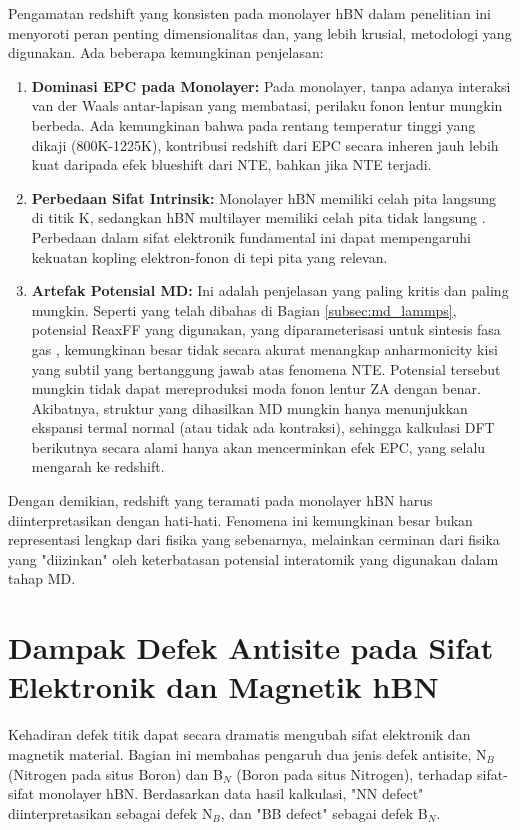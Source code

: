 Pengamatan redshift yang konsisten pada monolayer hBN dalam penelitian ini menyoroti peran penting dimensionalitas dan, yang lebih krusial, metodologi yang digunakan. Ada beberapa kemungkinan penjelasan:
\begin{enumerate}
    \item \textbf{Dominasi EPC pada Monolayer:} Pada monolayer, tanpa adanya interaksi van der Waals antar-lapisan yang membatasi, perilaku fonon lentur mungkin berbeda. Ada kemungkinan bahwa pada rentang temperatur tinggi yang dikaji (800K-1225K), kontribusi redshift dari EPC secara inheren jauh lebih kuat daripada efek blueshift dari NTE, bahkan jika NTE terjadi.
    \item \textbf{Perbedaan Sifat Intrinsik:} Monolayer hBN memiliki celah pita langsung di titik K, sedangkan hBN multilayer memiliki celah pita tidak langsung \citep{Wickramaratne2018}. Perbedaan dalam sifat elektronik fundamental ini dapat mempengaruhi kekuatan kopling elektron-fonon di tepi pita yang relevan.
    \item \textbf{Artefak Potensial MD:} Ini adalah penjelasan yang paling kritis dan paling mungkin. Seperti yang telah dibahas di Bagian \ref{subsec:md_lammps}, potensial ReaxFF yang digunakan, yang diparameterisasi untuk sintesis fasa gas \citep{Lele2022}, kemungkinan besar tidak secara akurat menangkap anharmonicity kisi yang subtil yang bertanggung jawab atas fenomena NTE. Potensial tersebut mungkin tidak dapat mereproduksi moda fonon lentur ZA dengan benar. Akibatnya, struktur yang dihasilkan MD mungkin hanya menunjukkan ekspansi termal normal (atau tidak ada kontraksi), sehingga kalkulasi DFT berikutnya secara alami hanya akan mencerminkan efek EPC, yang selalu mengarah ke redshift.
\end{enumerate}
Dengan demikian, redshift yang teramati pada monolayer hBN harus diinterpretasikan dengan hati-hati. Fenomena ini kemungkinan besar bukan representasi lengkap dari fisika yang sebenarnya, melainkan cerminan dari fisika yang "diizinkan" oleh keterbatasan potensial interatomik yang digunakan dalam tahap MD.

\section{Dampak Defek Antisite pada Sifat Elektronik dan Magnetik hBN}
\label{sec:hbn_defek}
Kehadiran defek titik dapat secara dramatis mengubah sifat elektronik dan magnetik material. Bagian ini membahas pengaruh dua jenis defek antisite, N$_B$ (Nitrogen pada situs Boron) dan B$_N$ (Boron pada situs Nitrogen), terhadap sifat-sifat monolayer hBN. Berdasarkan data hasil kalkulasi, "NN defect" diinterpretasikan sebagai defek N$_B$, dan "BB defect" sebagai defek B$_N$.

